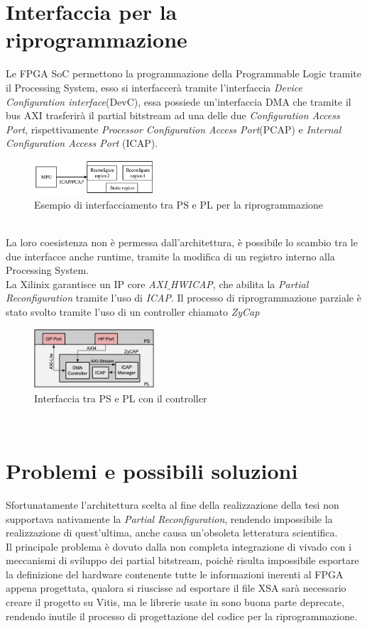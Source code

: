 \section{Interfaccia per la riprogrammazione}
Le FPGA SoC permettono la programmazione della Programmable Logic tramite il Processing System, esso si interfaccerà tramite l'interfaccia \textit{Device Configuration interface}(DevC), essa possiede un'interfaccia DMA che tramite il bus AXI trasferirà il partial bitstream ad una delle due \textit{Configuration Access Port}, rispettivamente \textit{Processor Configuration Access Port}(PCAP) e \textit{Internal Configuration Access Port} (ICAP).
\begin{figure}
    \centering
    \includegraphics[width=0.4\textwidth]{images/PRR.png}
    \caption{Esempio di interfacciamento tra PS e PL per la riprogrammazione\cite{PRR2}}
    \label{fig:my_label}
\end{figure}\\
La loro coesistenza non è permessa dall'architettura, è possibile lo scambio tra le due interfacce anche runtime, tramite la modifica di un registro interno alla Processing System.\\
La Xilinix garantisce un IP core \textit{AXI$\_$HWICAP}, che abilita la \textit{Partial Reconfiguration} tramite l'uso di \textit{ICAP}. Il processo di riprogrammazione parziale è stato svolto tramite l'uso di un controller chiamato \textit{ZyCap}\cite{PRR}
\begin{figure}
    \centering
    \includegraphics[width=0.4\textwidth]{images/ZyCap.png}
    \caption{Interfaccia tra PS e PL con il controller}
    \label{fig:my_label}
\end{figure}\\
\section{Problemi e possibili soluzioni}
Sfortunatamente l'architettura scelta al fine della realizzazione della tesi non supportava nativamente la \textit{Partial Reconfiguration}, rendendo impossibile la realizzazione di quest'ultima, anche causa un'obsoleta letteratura scientifica.\\
Il principale problema è dovuto dalla non completa integrazione di vivado con i meccanismi di sviluppo dei partial bitstream, poichè risulta impossibile esportare la definizione del hardware contenente tutte le informazioni inerenti al FPGA appena progettata, qualora si riuscisse ad esportare il file XSA sarà necessario creare il progetto su Vitis, ma le librerie usate in \cite{PRR} sono buona parte deprecate, rendendo inutile il processo di progettazione del codice per la riprogrammazione.\\

